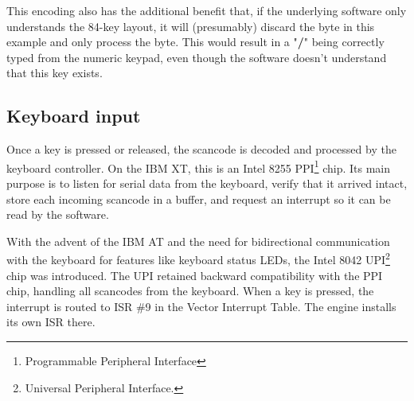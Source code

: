 \documentclass[book.tex]{subfiles}
\begin{document}
\par
This encoding also has the additional benefit that, if the underlying software only understands the 84-key layout, it will (presumably) discard the  byte in this example and only process the  byte. This would result in a "\textbf{/}" being correctly typed from the numeric keypad, even though the software doesn't understand that this key exists.\\




\subsection{Keyboard input}
Once a key is pressed or released, the scancode is decoded and processed by the keyboard controller. On the IBM XT, this is an Intel 8255 PPI\footnote{Programmable Peripheral Interface} chip. Its main purpose is to listen for serial data from the keyboard, verify that it arrived intact, store each incoming scancode in a buffer, and request an interrupt so it can be read by the software.\\

\par
With the advent of the IBM AT and the need for bidirectional communication with the keyboard for features like keyboard status LEDs, the Intel 8042 UPI\footnote{Universal Peripheral Interface.} chip was introduced. The UPI retained backward compatibility with the PPI chip, handling all scancodes from the keyboard. When a key is pressed, the interrupt is routed to ISR \#9 in the Vector Interrupt Table. The engine installs its own ISR there.\\
\end{document}
